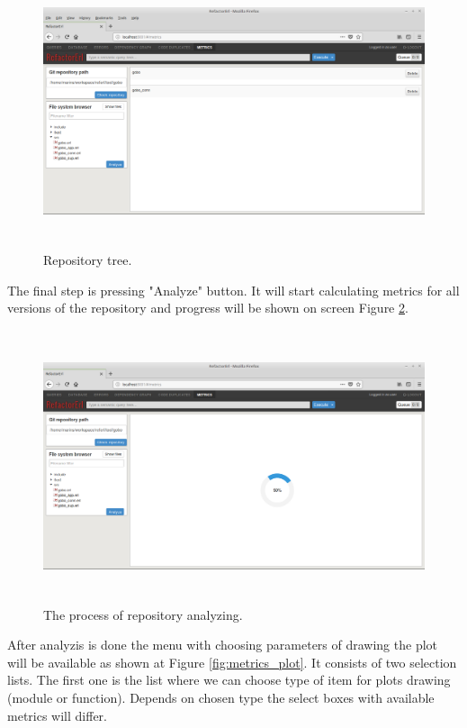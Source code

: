\begin{figure}[h]
	\includegraphics[height=80mm]{figures/files.png}
	\caption{Repository tree.}
	\label{fig:metrics_files}
\end{figure}

The final step is pressing "Analyze" button. It will start calculating metrics for all versions of the repository and progress will be shown on screen Figure \ref{fig:metrics_analyze}. 

\begin{figure}[h]
	\includegraphics[height=80mm]{figures/analyze.png}
	\caption{The process of repository analyzing.}
	\label{fig:metrics_analyze}
\end{figure}

After analyzis is done the menu with choosing parameters of drawing the plot will be available as shown at Figure \ref{fig:metrics_plot}. It consists of two selection lists. The first one is the list where we can choose type of item for plots drawing (module or function). Depends on chosen type the select boxes with available metrics will differ. 

